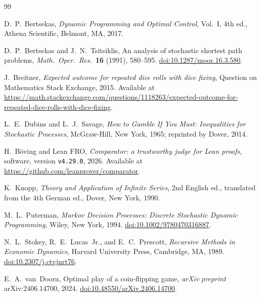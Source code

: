\documentclass[12pt]{article}
\theoremstyle{definition}
\theoremstyle{remark}
\begin{document}
\begin{thebibliography}{99}

  D.~P.~Bertsekas,
  \emph{Dynamic Programming and Optimal Control},
  Vol.~I, 4th ed.,
  Athena Scientific, Belmont, MA, 2017.

  D.~P.~Bertsekas and J.~N.~Tsitsiklis,
  An analysis of stochastic shortest path problems,
  \emph{Math.\ Oper.\ Res.}\ \textbf{16} (1991), 580--595.
  \href{https://doi.org/10.1287/moor.16.3.580}{doi:10.1287/moor.16.3.580}.

  J.~Breitner,
  \emph{Expected outcome for repeated dice rolls with dice fixing},
  Question on Mathematics Stack Exchange, 2015.
  Available at
  \url{https://math.stackexchange.com/questions/1118263/expected-outcome-for-repeated-dice-rolls-with-dice-fixing}.

  L.~E.~Dubins and L.~J.~Savage,
  \emph{How to Gamble If You Must: Inequalities for Stochastic
    Processes},
  McGraw-Hill, New York, 1965;
  reprinted by Dover, 2014.

  H.~B\"oving and Lean FRO,
  \emph{Comparator: a trustworthy judge for Lean proofs},
  software, version \texttt{v4.29.0}, 2026.
  Available at \url{https://github.com/leanprover/comparator}.

  K.~Knopp,
  \emph{Theory and Application of Infinite Series},
  2nd English ed.,
  translated from the 4th German ed.,
  Dover, New York, 1990.

  M.~L.~Puterman,
  \emph{Markov Decision Processes: Discrete Stochastic Dynamic
    Programming},
  Wiley, New York, 1994.
  \href{https://doi.org/10.1002/9780470316887}{doi:10.1002/9780470316887}.

  N.~L.~Stokey, R.~E.~Lucas~Jr., and E.~C.~Prescott,
  \emph{Recursive Methods in Economic Dynamics},
  Harvard University Press, Cambridge, MA, 1989.
  \href{https://doi.org/10.2307/j.ctvjnrt76}{doi:10.2307/j.ctvjnrt76}.

  E.~A.~van~Doorn,
  Optimal play of a coin-flipping game,
  \emph{arXiv preprint} arXiv:2406.14700, 2024.
  \href{https://doi.org/10.48550/arXiv.2406.14700}{doi:10.48550/arXiv.2406.14700}.

\end{thebibliography}
\end{document}
